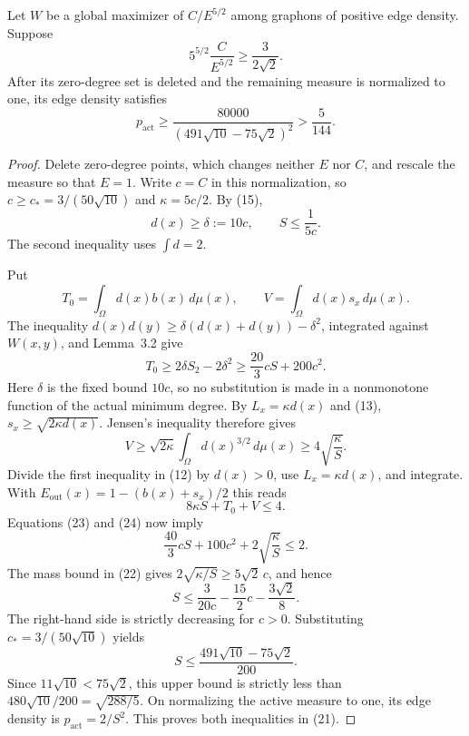 \begin{proposition}\label{prop:active-density}
Let \(W\) be a global maximizer of \(C/E^{5/2}\) among graphons of
positive edge density. Suppose
\[
 5^{5/2}\frac{C}{E^{5/2}}\ge\frac{3}{2\sqrt2}.
\]
After its zero-degree set is deleted and the remaining measure is
normalized to one, its edge density satisfies
\begin{equation}
 p_{\mathrm{act}}\ge
 \frac{80000}{(491\sqrt{10}-75\sqrt2)^2}>\frac5{144}.\tag{21}
\end{equation}
\end{proposition}
\begin{proof}
Delete zero-degree points, which changes neither \(E\) nor \(C\), and
rescale the measure so that \(E=1\). Write \(c=C\) in this normalization,
so \(c\ge c_*=3/(50\sqrt{10})\) and \(\kappa=5c/2\). By (15),
\begin{equation}
 d(x)\ge\delta:=10c,\qquad S\le\frac1{5c}.\tag{22}
\end{equation}
The second inequality uses \(\int d=2\).

Put
\[
 T_0=\int_\Omega d(x)b(x)\,d\mu(x),\qquad
 V=\int_\Omega d(x)s_x\,d\mu(x).
\]
The inequality
\(d(x)d(y)\ge\delta(d(x)+d(y))-\delta^2\), integrated against \(W(x,y)\),
and Lemma~3.2 give
\begin{equation}
 T_0\ge2\delta S_2-2\delta^2
       \ge\frac{20}{3}cS+200c^2.\tag{23}
\end{equation}
Here \(\delta\) is the fixed bound \(10c\), so no substitution is made in
a nonmonotone function of the actual minimum degree. By
\(L_x=\kappa d(x)\) and (13), \(s_x\ge\sqrt{2\kappa d(x)}\).
Jensen's inequality therefore gives
\begin{equation}
 V\ge\sqrt{2\kappa}\int_\Omega d(x)^{3/2}\,d\mu(x)
       \ge4\sqrt{\frac{\kappa}{S}}.\tag{24}
\end{equation}
Divide the first inequality in (12) by \(d(x)>0\), use
\(L_x=\kappa d(x)\), and integrate. With
\(E_{\mathrm{out}}(x)=1-(b(x)+s_x)/2\) this reads
\[
 8\kappa S+T_0+V\le4.
\]
Equations (23) and (24) now imply
\[
 \frac{40}{3}cS+100c^2+2\sqrt{\frac{\kappa}{S}}\le2.
\]
The mass bound in (22) gives \(2\sqrt{\kappa/S}\ge5\sqrt2\,c\), and hence
\[
 S\le\frac3{20c}-\frac{15}{2}c-\frac{3\sqrt2}{8}.
\]
The right-hand side is strictly decreasing for \(c>0\). Substituting
\(c_*=3/(50\sqrt{10})\) yields
\[
 S\le\frac{491\sqrt{10}-75\sqrt2}{200}.
\]
Since \(11\sqrt{10}<75\sqrt2\), this upper bound is strictly less than
\(480\sqrt{10}/200=\sqrt{288/5}\). On normalizing the active measure to
one, its edge density is \(p_{\mathrm{act}}=2/S^2\). This proves both
inequalities in (21).
\end{proof}

